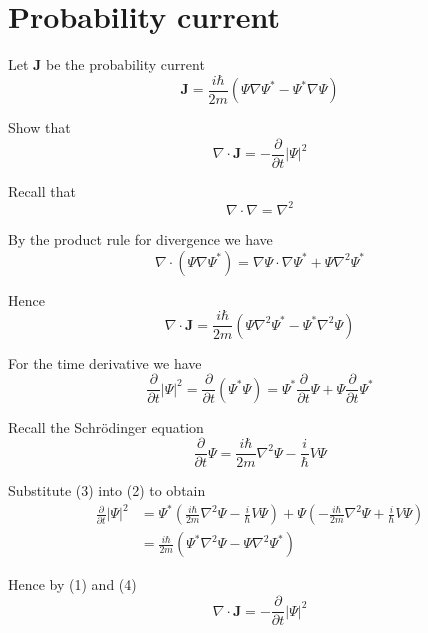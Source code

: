 

\section*{Probability current}

Let $\mathbf J$ be the probability current
\begin{equation*}
\mathbf J=\frac{i\hbar}{2m}\left(\Psi\nabla\Psi^*-\Psi^*\nabla\Psi\right)
\end{equation*}

Show that
\begin{equation*}
\nabla\cdot\mathbf J=-\frac{\partial}{\partial t}|\Psi|^2
\end{equation*}

Recall that
\begin{equation*}
\nabla\cdot\nabla=\nabla^2
\end{equation*}

By the product rule for divergence we have
\begin{equation*}
\nabla\cdot(\Psi\nabla\Psi^*)
=\nabla\Psi\cdot\nabla\Psi^*+\Psi\nabla^2\Psi^*
\end{equation*}

Hence
\begin{equation*}
\nabla\cdot\mathbf J
=\frac{i\hbar}{2m}\left(\Psi\nabla^2\Psi^*-\Psi^*\nabla^2\Psi\right)
\tag{1}
\end{equation*}

For the time derivative we have
\begin{equation*}
\frac{\partial}{\partial t}|\Psi|^2
=\frac{\partial}{\partial t}(\Psi^*\Psi)
=\Psi^*\frac{\partial}{\partial t}\Psi+\Psi\frac{\partial}{\partial t}\Psi^*
\tag{2}
\end{equation*}

Recall the Schr\"odinger equation
\begin{equation*}
\frac{\partial}{\partial t}\Psi
=\frac{i\hbar}{2m}\nabla^2\Psi-\frac{i}{\hbar}V\Psi
\tag{3}
\end{equation*}

Substitute (3) into (2) to obtain
\begin{align*}
\frac{\partial}{\partial t}|\Psi|^2
&=\Psi^*\left(\frac{i\hbar}{2m}\nabla^2\Psi-\frac{i}{\hbar}V\Psi\right)
+\Psi\left(-\frac{i\hbar}{2m}\nabla^2\Psi+\frac{i}{\hbar}V\Psi\right)
\\
&=\frac{i\hbar}{2m}\left(\Psi^*\nabla^2\Psi-\Psi\nabla^2\Psi^*\right)
\tag{4}
\end{align*}

Hence by (1) and (4)
\begin{equation*}
\nabla\cdot\mathbf J=-\frac{\partial}{\partial t}|\Psi|^2
\end{equation*}


